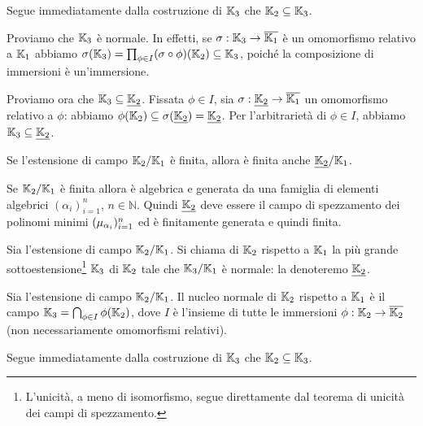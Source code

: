 \Proof Segue immediatamente dalla costruzione di $\mathbb{K}_3$ che $\mathbb{K}_2 \subseteq \mathbb{K}_3$.
\par Proviamo che $\mathbb{K}_3$ \`e normale. In effetti, se $\sigma: \mathbb{K}_3 \rightarrow \overline{\mathbb{K}_1}$ \`e un omomorfismo relativo a $\mathbb{K}_1$ abbiamo $\sigma(\mathbb{K}_3) = \prod_{\phi \in I} (\sigma \circ \phi)(\mathbb{K}_2) \subseteq \mathbb{K}_3$, poich\'e la composizione di immersioni \`e un'immersione.
\par Proviamo ora che $\Field_3 \subseteq \NormalClosure{\Field_2}$. Fissata $\phi \in I$, sia $\RelativeHomomorphism: \NormalClosure{\Field_2} \rightarrow \AlgebraicClosure{\Field_1}$ un omomorfismo relativo a $\phi$: abbiamo $\phi(\Field_2) \subseteq \RelativeHomomorphism(\NormalClosure{\Field_2}) = \NormalClosure{\Field_2}$. Per l'arbitrariet\`a di $\phi \in I$, abbiamo $\Field_3 \subseteq \NormalClosure{\Field_2}$. \EndProof
\begin{Theorem}	
	Se l'estensione di campo $\mathbb{K}_2/\mathbb{K}_1$ \`e finita, allora \`e finita anche $\FieldExtension{\NormalClosure{\Field_2}}{\Field_1}$.
\end{Theorem}
\Proof Se $\mathbb{K}_2/\mathbb{K}_1$ \`e finita allora \`e algebrica e generata da una famiglia di elementi algebrici $(\alpha_i)_{i = 1}^n$, $n \in \mathbb{N}$. Quindi $\NormalClosure{\Field_2}$ deve essere il campo di spezzamento dei polinomi minimi $(\MinimalPolynomial{\alpha_i})_{i =1}^n$ ed \`e finitamente generata e quindi finita. \EndProof
\begin{Definition}
	Sia l'estensione di campo $\mathbb{K}_2/\mathbb{K}_1$. Si chiama  di $\mathbb{K}_2$ rispetto a $\mathbb{K}_1$ la pi\`u grande sottoestensione\footnote{L'unicit\`a, a meno di isomorfismo, segue direttamente dal teorema di unicit\`a dei campi di spezzamento.} $\mathbb{K}_3$ di $\mathbb{K}_2$ tale che $\mathbb{K}_3/\mathbb{K}_1$ \`e normale: la denoteremo $\NormalClosure{\Field_2}$.
\end{Definition}
\begin{Theorem}
	Sia l'estensione di campo $\mathbb{K}_2/\mathbb{K}_1$. Il nucleo normale di $\mathbb{K}_2$ rispetto a $\mathbb{K}_1$ \`e il campo $\mathbb{K}_3 = \bigcap_{\phi \in I}{\phi(\mathbb{K}_2)}$, dove $I$ \`e l'insieme di tutte le immersioni $\phi: \mathbb{K}_2 \rightarrow \overline{\mathbb{K}_2}$ (non necessariamente omomorfismi relativi).
\end{Theorem}
\Proof Segue immediatamente dalla costruzione di $\mathbb{K}_3$ che $\mathbb{K}_2 \subseteq \mathbb{K}_3$.
